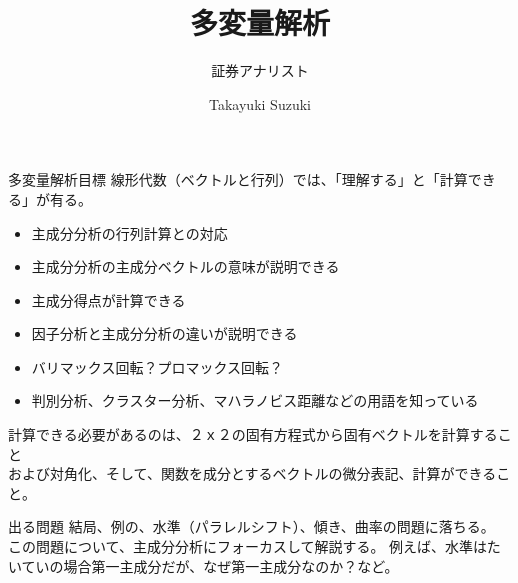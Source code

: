 \documentclass[dvipdfmx,autodetect-engine, unicode, 10pt, aspectratio=169]{beamer}
\title{多変量解析}
\subtitle{証券アナリスト}
\date{}
\author{Takayuki Suzuki}
\institute{This is institude of the author}
\begin{document}
\maketitle


\begin{frame}{多変量解析目標}
    線形代数（ベクトルと行列）では、「理解する」と「計算できる」が有る。 
    \begin{itemize}
        \item 主成分分析の行列計算との対応
        \item 主成分分析の主成分ベクトルの意味が説明できる
        \item 主成分得点が計算できる
        \item 因子分析と主成分分析の違いが説明できる
        \item バリマックス回転？プロマックス回転？
        \item 判別分析、クラスター分析、マハラノビス距離などの用語を知っている
    \end{itemize}
    計算できる必要があるのは、２ｘ２の固有方程式から固有ベクトルを計算すること \\
    および対角化、そして、関数を成分とするベクトルの微分表記、計算ができること。 \\
\end{frame}

\begin{frame}{出る問題}
    結局、例の、水準（パラレルシフト）、傾き、曲率の問題に落ちる。\\
    この問題について、主成分分析にフォーカスして解説する。
    例えば、水準はたいていの場合第一主成分だが、なぜ第一主成分なのか？など。
\end{frame}
\end{document}

